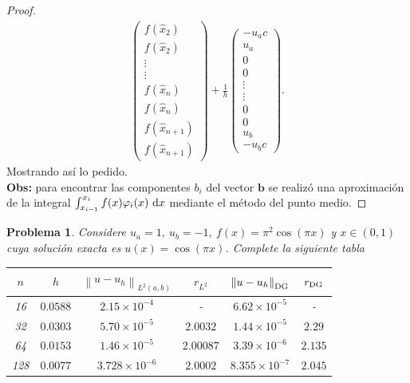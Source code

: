 \documentclass[10pt,a4paper]{report}
\newtheorem{pro}{Problema}
\newcommand{\dx}{\textup{d}x}
\providecommand{\norm}[1]{\left\lVert#1\right\rVert}
\begin{document}
\begin{proof}
\begin{align*}
\begin{pmatrix}
    		f(\hat{x}_{2})\\ 
    		f(\hat{x}_{2})\\ 
    		\vdots\\ 
    		\vdots\\ 
    		f(\hat{x}_{n})\\ 
    		f(\hat{x}_{n})\\ 
    		f(\hat{x}_{n+1})\\ 
    		f(\hat{x}_{n+1})
    	\end{pmatrix} + \frac{1}{h}\begin{pmatrix}
    		-u_{a}c\\ 
    		u_{a}\\ 
    		0\\ 
    		0\\ 
    		\vdots\\ 
    		\vdots\\ 
    		0\\ 
    		0\\ 
    		u_{b}\\ 
    		-u_{b}c
    	\end{pmatrix}.
    \end{align*}
    Mostrando así lo pedido.\\
    \textbf{Obs:} para encontrar las componentes $b_{i}$ del vector $\textbf{b}$ se realizó una aproximación de la integral $\int_{x_{i-1}}^{x_{i}}f(x)\varphi_{i}(x)\ \dx$ mediante el método del punto medio.
    \end{proof}
    \begin{pro}
    	Considere $u_{a} = 1,\ u_{b}=-1,\ f(x) = \pi^{2}\cos(\pi x)$ y $x\in\left(0,1\right)$ cuya solución exacta es $u(x) = \cos(\pi x)$. Complete la siguiente tabla
    	\begin{center}
    		\begin{tabular}{c||c||c||c||c||c}
    			\hline
    			$n$ & $h$ & $\norm{u-u_{h}}_{L^{2}(a,b)}$ & $r_{L^{2}}$ & $\norm{u-u_{h}}_{\textup{DG}}$ & $r_{\textup{DG}}$ \\
    			\hline
    			16 & $0.0588$ & $2.15\times10^{-4}$ & - & $6.62\times10^{-5}$  & - \\
    			\hline
    			32 & $0.0303$ & $5.70\times10^{-5}$ & $2.0032$ & $1.44\times10^{-5}$ & $2.29$  \\
    			\hline
    			64 & $0.0153$ & $1.46\times10^{-5}$ & $2.00087$ & $3.39\times10^{-6}$ & $2.135$ \\
    			\hline
    			128 & $0.0077$  & $3.728\times10^{-6}$ & $2.0002$ & $8.355\times10^{-7}$  & $2.045$ \\
    			\hline
    		\end{tabular}
    	\end{center}
    	
    \end{pro}
    	
\end{document}
